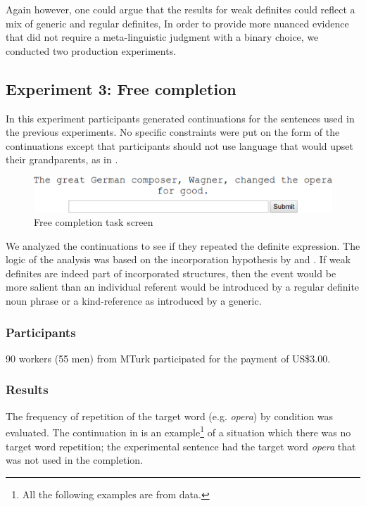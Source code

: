 \documentclass[output=paper,
modfonts
]{langscibook}
\begin{document}
Again however, one could argue that the results for weak definites could reflect a mix of generic and regular definites,  In order to provide more nuanced evidence that did not require a meta-linguistic judgment with a binary choice, we conducted two production experiments. 

\subsection{Experiment 3: Free completion} 

In this experiment participants generated continuations for the sentences used in the previous experiments. No specific constraints were put on the form of the continuations except that participants should not use language that would upset their grandparents, as in .


\begin{figure}[H]
\centering
\includegraphics[width=1\textwidth]{figures/fig_compinput}
\caption{Free completion task screen}
\label{fig:desaetal:8}
\end{figure}

We analyzed the continuations to see if they repeated the definite expression. The logic of the analysis was based on the incorporation hypothesis by \citet{CarlsonEtAlii2013} and \citet{KleinEtAlii2013}. If weak definites are indeed part of incorporated structures, then the event would be more salient than an individual referent would be introduced by a regular definite noun phrase or a kind-reference as introduced by a generic.

\subsubsection{Participants}
90 workers (55 men) from MTurk participated for the payment of US\$3.00. 

\subsubsection{Results}

The frequency of repetition of the target word (e.g. \textit{opera}) by condition was evaluated. The continuation in  is an example\footnote{All the following examples are from data.} of a situation which there was no target word repetition; the experimental sentence had the target word  \textit{opera} that was not used in the completion. 
\end{document}

